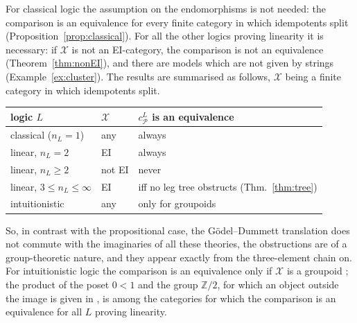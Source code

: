 \documentclass[11pt]{amsart}
\theoremstyle{definition}
\newcommand{\cX}{\mathcal X}
\newcommand{\cP}{\mathcal P}
\begin{document}
For classical logic the assumption on the endomorphisms is not needed:
the comparison is an equivalence for every finite category in which
idempotents split (Proposition~\ref{prop:classical}). For all the
other logics proving linearity it is necessary: if $\cX$ is not an
EI-category, the comparison is not an equivalence
(Theorem~\ref{thm:nonEI}), and there are models which are not given
by strings (Example~\ref{ex:cluster}). The results are
summarised as follows, $\cX$ being a finite category in which
idempotents split.
\begin{center}
\begin{tabular}{lll}
logic $L$ & $\cX$ & $c^L_\cP$ is an equivalence\\\hline
classical ($n_L=1$) & any & always\\
linear, $n_L=2$ & EI & always\\
linear, $n_L\ge2$ & not EI & never\\
linear, $3\le n_L\le\infty$ & EI & iff no leg tree obstructs
(Thm.~\ref{thm:tree})\\
intuitionistic & any & only for groupoids \cite{Heyting}
\end{tabular}
\end{center}
So, in contrast with the propositional case, the
G\"odel--Dummett translation does not commute with the imaginaries of
all these theories, the obstructions are of a group-theoretic nature,
and they appear exactly from the three-element chain on. For
intuitionistic logic the comparison is an equivalence only
if $\cX$ is a groupoid \cite[Thm.~1.1]{Heyting}; the product of the
poset $0<1$ and the group $\mathbb Z/2$, for which an object outside
the image is given in \cite[Ex.~7.16]{Heyting}, is among the
categories for which the comparison is an equivalence for all $L$
proving linearity.
\end{document}
